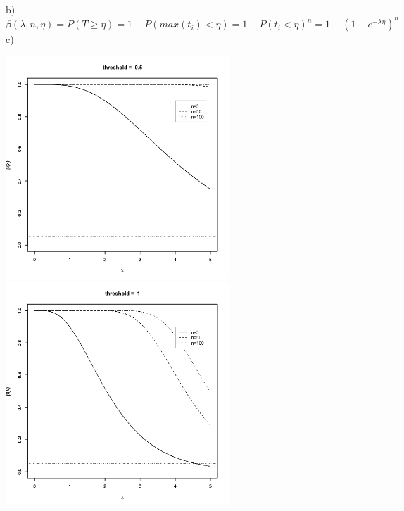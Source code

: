 \documentclass[11pt]{article}
\begin{document}
b) $\beta(\lambda,n,\eta)=P(T \geq \eta) =  1 - P(max(t_i)< \eta) =1 - P(t_i<\eta)^n =  1 - (1 - e^{-\lambda \eta})^n$\\

c) 

\begin{centering}
\includegraphics[height = 3.3in]{Q1} \includegraphics[height = 3.3in]{Q2} 

\end{centering}
\end{document}
